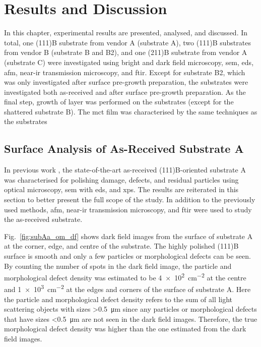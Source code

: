 \chapter{Results and Discussion}\label{ch:results-and-discussion}
In this chapter, experimental results are presented, analysed, and discussed. In total, one (111)B substrate from vendor A (substrate A), two (111)B substrates from vendor B (substrate B and B2), and one (211)B substrate from vendor A (substrate C) were investigated using bright and dark field microscopy, \ac{sem}, \ac{eds}, \ac{afm}, near-\ac{ir} transmission microscopy, and \ac{ftir}. Except for substrate B2, which was only investigated after surface pre-growth preparation, the substrates were investigated both as-received and after surface pre-growth preparation. As the final step, growth of  layer was performed on the substrates (except for the shattered substrate B). The \ac{mct} film was characterised by the same techniques as the substrates

\section{Surface Analysis of As-Received Substrate A}\label{sec:subAa}
In previous work \citep{lauten2017characterisation}, the state-of-the-art as-received (111)B-oriented substrate A was characterised for polishing damage, defects, and residual particles using optical microscopy, \ac{sem} with \ac{eds}, and \ac{xps}. The results are reiterated in this section to better present the full scope of the study. In addition to the previously used methods, \ac{afm}, near-\ac{ir} transmission microscopy, and \ac{ftir} were used to study the as-received substrate.

Fig.~\ref{fig:subAa_om_df} shows dark field images from the surface of substrate A at the corner, edge, and centre of the substrate. The highly polished (111)B surface is smooth and only a few particles or morphological defects can be seen. By counting the number of spots in the dark field image, the particle and morphological defect density was estimated to be \SI{4e2}{\centi\metre^{-2}} at the centre and \SI{1e3}{\centi\metre^{-2}} at the edges and corners of the surface of substrate A. Here the particle and morphological defect density refers to the sum of all light scattering objects with sizes \SI{>0.5}{\micro\metre} since any particles or morphological defects that have sizes \SI{<0.5}{\micro\metre} are not seen in the dark field images. Therefore, the true morphological defect density was higher than the one estimated from the dark field images.

